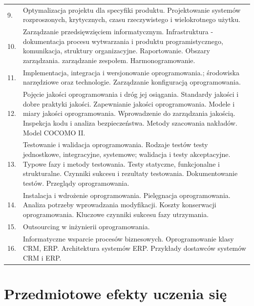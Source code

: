 \documentclass[12pt, a4paper]{article}
\begin{document}
{\begin{longtable}{m{1.5cm}m{14.5cm}}
  \rowcolor{tableRowLight} 9. & Optymalizacja projektu dla specyfiki produktu. Projektowanie systemów rozproszonych, krytycznych, czasu rzeczywistego i wielokrotnego użytku. \\
  \rowcolor{tableRowAlt} 10. & Zarządzanie przedsięwzięciem informatycznym. Infrastruktura - dokumentacja procesu wytwarzania i produktu programistycznego, komunikacja, struktury organizacyjne. Raportowanie. Obszary zarządzania. zarządzanie zespołem. Harmonogramowanie. \\
  \rowcolor{tableRowLight} 11. & Implementacja, integracja i wersjonowanie oprogramowania.; środowiska narzędziowe oraz technologie. Zarządzanie konfiguracją oprogramowania. \\
  \rowcolor{tableRowAlt} 12. & Pojęcie jakości oprogramowania i dróg jej osiągania. Standardy jakości i dobre praktyki jakości. Zapewnianie jakości oprogramowania. Modele i miary jakości oprogramowania. Wprowadzenie do zarządzania jakością. Inspekcja kodu i analiza bezpieczeństwa. Metody szacowania nakładów. Model COCOMO II. \\
  \rowcolor{tableRowLight} 13. & Testowanie i walidacja oprogramowania. Rodzaje testów testy jednostkowe, integracyjne, systemowe; walidacja i testy akceptacyjne. Typowe fazy i metody testowania. Testy statyczne, funkcjonalne i strukturalne. Czynniki sukcesu i rezultaty testowania. Dokumentowanie testów. Przeglądy oprogramowania. \\
  \rowcolor{tableRowAlt} 14. & Instalacja i wdrożenie oprogramowania. Pielęgnacja oprogramowania. Analiza potrzeby wprowadzania modyfikacji. Koszty konserwacji oprogramowania. Kluczowe czynniki sukcesu fazy utrzymania. \\
  \rowcolor{tableRowLight} 15. & Outsourcing w inżynierii oprogramowania. \\
  \rowcolor{tableRowAlt} 16. & Informatyczne wsparcie procesów biznesowych. Oprogramowanie klasy CRM, ERP. Architektura systemów ERP. Przykłady dostawców systemów CRM i ERP. \\
\bottomrule
\end{longtable}}

\section{Przedmiotowe efekty uczenia się}
\end{document}
